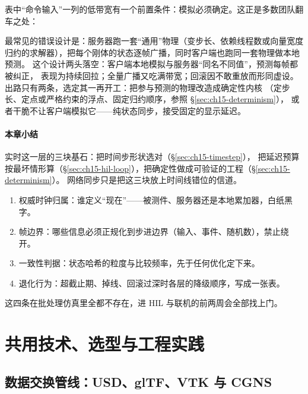 \documentclass[12pt,a4paper,fontset=fandol]{ctexbook}
\begin{document}
表中``命令输入''一列的低带宽有一个前置条件：模拟必须确定。这正是多数团队翻车之处：

\begin{warning}[title={把非确定性的物理直接当权威状态复制给每个客户端}]
最常见的错误设计是：服务器跑一套``通用''物理（变步长、依赖线程数或向量宽度
归约的求解器），把每个刚体的状态逐帧广播，同时客户端也跑同一套物理做本地预测。
这个设计两头落空：客户端本地模拟与服务器``同名不同值''，预测每帧都被纠正，
表现为持续回拉；全量广播又吃满带宽；回滚因不敢重放而形同虚设。
出路只有两条，选定其一再开工：把参与预测的物理改造成确定性内核
（定步长、定点或严格约束的浮点、固定归约顺序，参照 \S\ref{sec:ch15-determinism}），
或者干脆不让客户端模拟它——纯状态同步，接受固定的显示延迟。
\end{warning}

\subsection*{本章小结}
实时这一层的三块基石：把时间步形状选对（\S\ref{sec:ch15-timestep}），
把延迟预算按最坏情形算（\S\ref{sec:ch15-hil-loop}），把确定性做成可验证的工程（\S\ref{sec:ch15-determinism}）。
网络同步只是把这三块放上时间线错位的信道。

\begin{bestpractice}[title={进入实时联调前钉死四件事}]
\begin{enumerate}
  \item 权威时钟归属：谁定义``现在''——被测件、服务器还是本地累加器，白纸黑字。
  \item 帧边界：哪些信息必须正规化到步进边界（输入、事件、随机数），禁止绕开。
  \item 一致性判据：状态哈希的粒度与比较频率，先于任何优化定下来。
  \item 退化行为：超截止期、掉线、回滚过深时各层的降级顺序，写成一张表。
\end{enumerate}
这四条在批处理仿真里全都不存在，进 HIL 与联机的前两周会全部找上门。
\end{bestpractice}

\part{共用技术、选型与工程实践}

\chapter{数据交换管线：USD、glTF、VTK 与 CGNS}
\label{ch:ch16-dataexchange}
\end{document}
